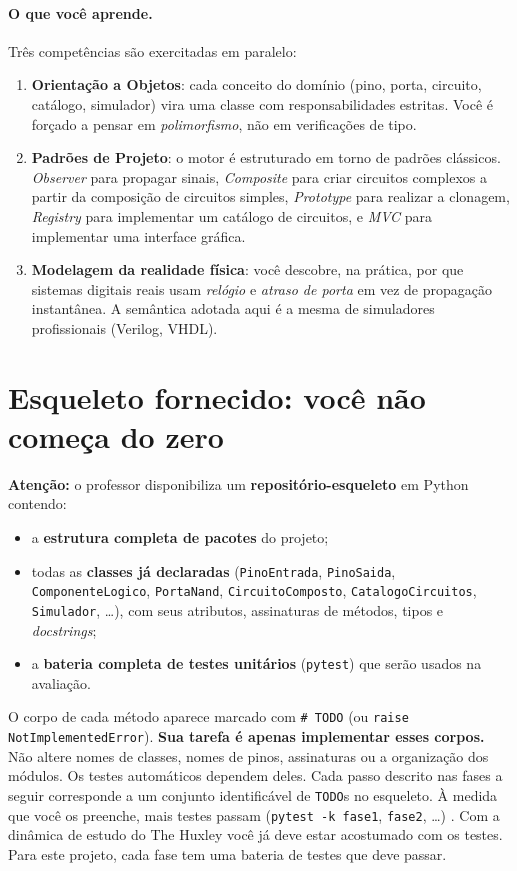 \documentclass[11pt,a4paper]{article}
\begin{document}
\paragraph{O que você aprende.} Três competências são exercitadas em paralelo:
\begin{enumerate}
    \item \textbf{Orientação a Objetos}: cada conceito do domínio (pino, porta, circuito, catálogo, simulador) vira uma classe com responsabilidades estritas. Você é forçado a pensar em \emph{polimorfismo}, não em verificações de tipo.
    \item \textbf{Padrões de Projeto}: o motor é estruturado em torno de padrões clássicos. \textit{Observer} para propagar sinais, \textit{Composite} para criar circuitos complexos a partir da composição de circuitos simples, \textit{Prototype} para realizar a clonagem, \textit{Registry} para implementar um catálogo de circuitos,  e \textit{MVC} para implementar uma interface gráfica.
    \item \textbf{Modelagem da realidade física}: você descobre, na prática, por que sistemas digitais reais usam \emph{relógio} e \emph{atraso de porta} em vez de propagação instantânea. A semântica adotada aqui é a mesma de simuladores profissionais (Verilog, VHDL).
\end{enumerate}

\section*{Esqueleto fornecido:  você não começa do zero}

\textbf{Atenção:} o professor disponibiliza um \textbf{repositório-esqueleto} em Python contendo:
\begin{itemize}
    \item a \textbf{estrutura completa de pacotes} do projeto;
    \item todas as \textbf{classes já declaradas} (\texttt{PinoEntrada}, \texttt{PinoSaida}, \texttt{ComponenteLogico}, \texttt{PortaNand}, \texttt{CircuitoComposto}, \texttt{CatalogoCircuitos}, \texttt{Simulador}, \dots), com seus atributos, assinaturas de métodos, tipos e \textit{docstrings};
    \item a \textbf{bateria completa de testes unitários} (\texttt{pytest}) que serão usados na avaliação.
\end{itemize}
O corpo de cada método aparece marcado com \texttt{\# TODO} (ou \texttt{raise NotImplementedError}). \textbf{Sua tarefa é apenas implementar esses corpos.} Não altere nomes de classes, nomes de pinos, assinaturas ou a organização dos módulos. Os testes automáticos dependem deles. Cada passo descrito nas fases a seguir corresponde a um conjunto identificável de \texttt{TODO}s no esqueleto. À medida que você os preenche, mais testes passam (\texttt{pytest -k fase1}, \texttt{fase2}, \dots) .  Com a dinâmica de estudo do The Huxley você já deve estar acostumado com os testes. Para este projeto, cada fase tem uma bateria de testes que deve passar.   
\end{document}
